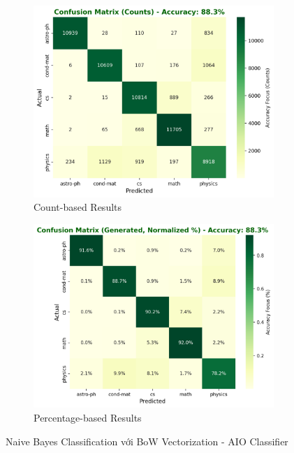 \begin{figure}[H]
\centering
\begin{subfigure}{0.48\textwidth}
    \centering
    \includegraphics[width=\textwidth]{image/NB_bow_count.png}
    \caption{Count-based Results}
    \label{fig:nb_bow_count_improvements}
\end{subfigure}
\hfill
\begin{subfigure}{0.48\textwidth}
    \centering
    \includegraphics[width=\textwidth]{image/NB_bow_Percent.png}
    \caption{Percentage-based Results}
    \label{fig:nb_bow_percent_improvements}
\end{subfigure}
\caption{Naive Bayes Classification với BoW Vectorization - AIO Classifier}
\label{fig:nb_bow_results_improvements}
\end{figure}

